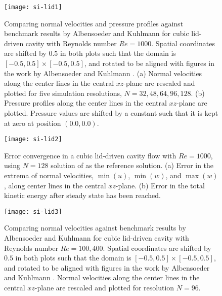 \documentclass[times, 10pt]{article}
\newcommand{\Rey}{\textit{Re}}
\begin{document}
            \begin{figure}
            \centering
                \texttt{[image: si-lid1]}
                \caption{
                Comparing normal velocities and pressure profiles against benchmark results by Albensoeder and Kuhlmann \cite{albensoeder05} for cubic lid-driven cavity with Reynolds number $\Rey=1000$.
                Spatial coordinates are shifted by $0.5$ in both plots such that the domain is $[-0.5,0.5]\times[-0.5,0.5]$, and rotated to be aligned with figures in the work by Albensoeder and Kuhlmann \cite{albensoeder05}.
                (a) Normal velocities along the center lines in the central $xz$-plane are rescaled and plotted for five simulation
                resolutions, $N=32, 48, 64, 96, 128$. (b) Pressure profiles along the center lines in the central $xz$-plane are plotted. Pressure
                values are shifted by a constant such that it is kept at zero at position $(0.0, 0.0)$.}
                \label{fig:aspect1_profiles_re1000}
            \end{figure}


            \begin{figure}
            \centering
                \texttt{[image: si-lid2]}
                \caption{Error convergence in a cubic lid-driven cavity flow with $\Rey=1000$, using $N=128$ solution of as the reference solution. (a) Error in the extrema of normal velocities, $\min(u)$, $\min(w)$, and $\max(w)$, along center lines in the central $xz$-plane. (b) Error in the total kinetic energy after steady state has been reached.}\label{fig:aspect1_conv}
            \end{figure}

            \begin{figure}
            \centering
                \texttt{[image: si-lid3]}
                \caption{
                Comparing normal velocities against benchmark results by Albensoeder and Kuhlmann \cite{albensoeder05} for cubic lid-driven cavity with Reynolds number $\Rey=100, 400$.
                Spatial coordinates are shifted by $0.5$ in both plots such that the domain is $[-0.5,0.5]\times[-0.5,0.5]$, and rotated to be aligned with figures in the work by Albensoeder and Kuhlmann \cite{albensoeder05}.
                Normal velocities along the center lines in the central $xz$-plane are rescaled and plotted for resolution $N=96$.}
                \label{fig:aspect1_profiles_re400}
            \end{figure}
\end{document}
